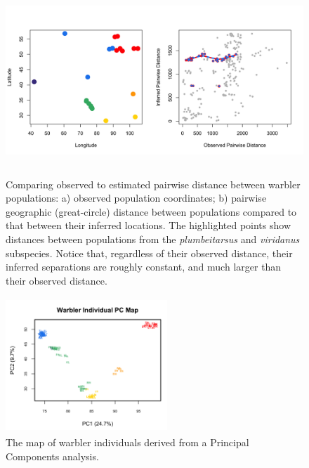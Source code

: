 \documentclass[12pt]{article}
\newcommand{\plr}[1]{{\it\color{purple}{(#1)}}}
\newcommand{\gc}[1]{{\it\color{blue}{(#1)}}}
\begin{document}
\begin{figure}
\centering
	{\includegraphics[width=6in,height=2.5in]{figs/warblers/warb_pop_dist_compare.png}}
	\caption{
    Comparing observed to estimated pairwise distance between warbler populations: a) observed population coordinates; b) pairwise geographic (great-circle) distance between populations compared to that between their inferred locations.  The highlighted points show distances between populations from the \textit{plumbeitarsus} and \textit{viridanus} subspecies.  Notice that, regardless of their observed distance, their inferred separations are roughly constant, and much larger than their observed distance.
    \plr{maybe instead of ``observed'' and ``inferred'', should be ``geographic'' and ``geogenetic''?}
    }
	\label{sfig:warb_pop_distcomp}
\end{figure}

\begin{figure}
	\centering
	\includegraphics[width=2.4in,height=2in]{figs/warblers/warb_ind_PC_map.png}
	\caption{The map of warbler individuals derived from a Principal Components analysis.}
	\label{sfig:warb_ind_PC_map}
\end{figure}

\end{document}
